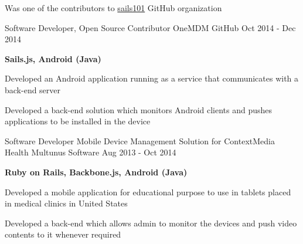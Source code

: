 \begin{cventries}
{\begin{cvitems}
        \item {Was one of the contributors to \href{https://github.com/sails101}{sails101} GitHub organization}
      \end{cvitems}
    }
  \cventry
    {Software Developer, Open Source Contributor}
    {OneMDM}
    {GitHub}
    {Oct 2014 - Dec 2014}
    {
      \begin{cvitems}
        \item {\textbf{Sails.js, Android (Java)}}
        \item {Developed an Android application running as a service that communicates with a back-end server}
        \item {Developed a back-end solution which monitors Android clients and pushes applications to be installed in the device}
      \end{cvitems} 
    }
  \cventry
    {Software Developer}
    {Mobile Device Management Solution for ContextMedia Health}
    {Multunus Software}
    {Aug 2013 - Oct 2014}
    {
      \begin{cvitems}
        \item {\textbf{Ruby on Rails, Backbone.js, Android (Java)}}
        \item {Developed a mobile application for educational purpose to use in tablets placed in medical clinics in United States}
        \item {Developed a back-end which allows admin to monitor the devices and push video contents to it whenever required}
      \end{cvitems}
    }
\end{cventries}